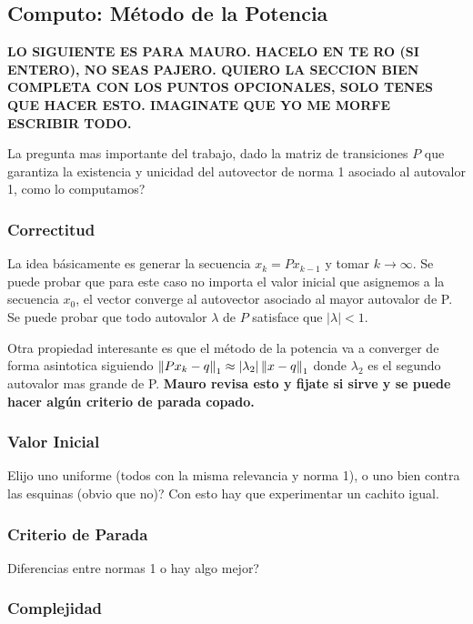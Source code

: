 \subsection{Computo: Método de la Potencia}

\textbf{LO SIGUIENTE ES PARA MAURO. HACELO EN TE RO (SI ENTERO), NO SEAS PAJERO. QUIERO LA SECCION BIEN COMPLETA CON LOS PUNTOS OPCIONALES, SOLO TENES QUE HACER ESTO. IMAGINATE QUE YO ME MORFE ESCRIBIR TODO.}

La pregunta mas importante del trabajo, dado la matriz de transiciones $P$ que garantiza la existencia y unicidad del autovector de norma 1 asociado al autovalor 1, como lo computamos?

\subsubsection{Correctitud}

La idea básicamente es generar la secuencia $x_k = Px_{k-1}$ y tomar $k\to\infty$. Se puede probar que para este caso no importa el valor inicial que asignemos a la secuencia $x_0$, el vector converge al autovector asociado al mayor autovalor de P. Se puede probar que todo autovalor $\lambda$ de $P$ satisface que $|\lambda| < 1$.

Otra propiedad interesante es que el método de la potencia va a converger de forma asintotica siguiendo $\left\lVert Px_k - q\right\rVert_1 \approx |\lambda_2| \left\lVert x-q\right\rVert_1$ donde $\lambda_2$ es el segundo autovalor mas grande de P. \textbf{Mauro revisa esto y fijate si sirve y se puede hacer algún criterio de parada copado.}

\subsubsection{Valor Inicial}

Elijo uno uniforme (todos con la misma relevancia y norma 1), o uno bien contra las esquinas (obvio que no)? Con esto hay que experimentar un cachito igual.

\subsubsection{Criterio de Parada}

Diferencias entre normas 1 o hay algo mejor?

\subsubsection{Complejidad}

